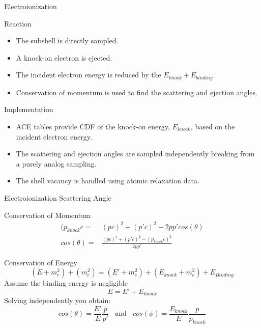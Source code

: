 \documentclass{beamer}
\begin{document}
\begin{frame}{Electroionization}

  \begin{block}{Reaction}
    \begin{itemize}
      \item The subshell is directly sampled.
      \item A knock-on electron is ejected.
      \item The incident electron energy is reduced by the $E_{knock} + E_{binding}$.
      \item Conservation of momentum is used to find the scattering and ejection angles.
      \end{itemize}
  \end{block}  
      
  \begin{block}{Implementation}
    \begin{itemize}
      \item ACE tables provide CDF of the knock-on energy, $E_{knock}$, based on the incident electron energy.
      \item The scattering and ejection angles are sampled independently breaking from a purely analog sampling.
      \item The shell vacancy is handled using atomic relaxation data. 
    \end{itemize}
  \end{block}  

\end{frame}

\begin{frame}{Electroionization Scattering Angle}

{\large Conservation of Momentum}
  \begin{align}
    (p_{knock}c = & (pc)^2 + (p'c)^2 - 2pp'cos(\theta) \nonumber \\
   cos(\theta) = & \frac{(pc)^2 + (p'c)^2 - (p_{knock}c)^2}{2pp'}  \nonumber
  \end{align}

{\large Conservation of Energy}
  \begin{equation*}
    (E + m_c^2) + (m_c^2) =(E' + m_c^2) + (E_{knock} + m_c^2) + E_{Binding}
  \end{equation*}
Assume the binding energy is negligible 
  \begin{equation*}
    E = E' + E_{knock}
  \end{equation*}
  Solving independently you obtain:
  $$ cos(\theta) = \frac{E'}{E}\frac{p}{p'}~~~~\text{and}~~~~
  cos(\phi)=\frac{E_{knock}}{E}\frac{p}{p_{knock}}$$


\end{frame}
\end{document}
